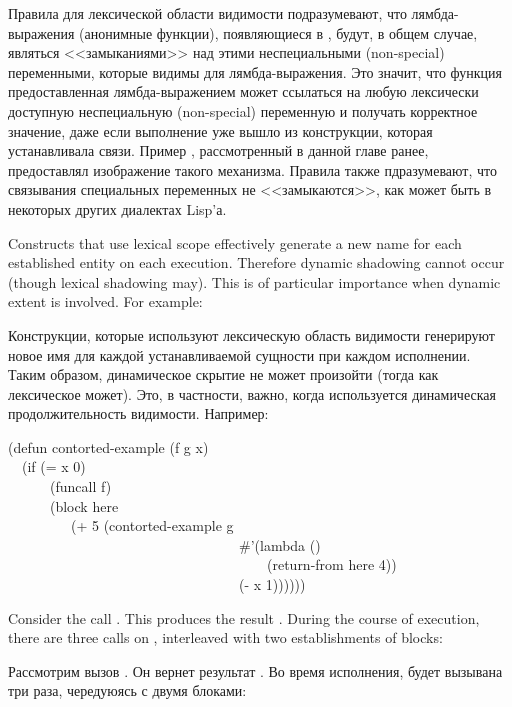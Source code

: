 Правила для лексической области видимости подразумевают, что лямбда-выражения
(анонимные функции), появляющиеся в , будут, в общем случае,
являться <<замыканиями>> над этими неспециальными (non-special) переменными,
которые видимы для лямбда-выражения.
Это значит, что функция предоставленная лямбда-выражением может ссылаться на
любую лексически доступную неспециальную (non-special) переменную и получать
корректное значение, даже если выполнение уже вышло из конструкции, которая
устанавливала связи.
Пример , рассмотренный в данной главе ранее, предоставлял
изображение такого механизма.
Правила также пдразумевают, что связывания специальных переменных не
<<замыкаются>>, как может быть в некоторых других диалектах Lisp'а.

Constructs that use lexical scope effectively
generate a new name for each established entity on each execution.
Therefore dynamic shadowing cannot occur (though lexical shadowing may).
This is of particular importance when dynamic extent is involved.
For example:

Конструкции, которые используют лексическую область видимости генерируют новое имя
для каждой устанавливаемой сущности при каждом исполнении.
Таким образом, динамическое скрытие не может произойти (тогда как лексическое
может).
Это, в частности, важно, когда используется динамическая продолжительность
видимости.
Например:

\begin{lisp}
(defun contorted-example (f g x) \\
~~(if (= x 0) \\
~~~~~~(funcall f) \\
~~~~~~(block here \\
~~~~~~~~~(+ 5 (contorted-example g \\
~~~~~~~~~~~~~~~~~~~~~~~~~~~~~~~~~\#'(lambda () \\
~~~~~~~~~~~~~~~~~~~~~~~~~~~~~~~~~~~~~(return-from here 4)) \\
~~~~~~~~~~~~~~~~~~~~~~~~~~~~~~~~~(- x 1))))))
\end{lisp}
Consider the call .  This produces
the result .  During the course of execution, there are three
calls on , interleaved with two establishments
of blocks:

Рассмотрим вызов . Он вернет результат
. Во время исполнения,  будет вызывана три раза,
чередуюясь с двумя блоками:

